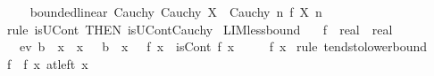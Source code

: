 \begin{isabellebody}
\isanewline
\ \ \isamarkupfalse%
\isanewline
{}\isamarkupfalse%
%
\endisatagproof
{\isafoldproof}%
%
\isadelimproof
\isanewline
%
\endisadelimproof
\isanewline
{}\isamarkupfalse%
\ {\isacharparenleft}{\kern0pt}\ bounded{\isacharunderscore}{\kern0pt}linear{\isacharparenright}{\kern0pt}\ Cauchy{\isacharcolon}{\kern0pt}\ {\isachardoublequoteopen}Cauchy\ X\ {\isasymLongrightarrow}\ Cauchy\ {\isacharparenleft}{\kern0pt}{\isasymlambda}n{\isachardot}{\kern0pt}\ f\ {\isacharparenleft}{\kern0pt}X\ n{\isacharparenright}{\kern0pt}{\isacharparenright}{\kern0pt}{\isachardoublequoteclose}\isanewline
%
\isadelimproof
\ \ %
\endisadelimproof
%
\isatagproof
{}\isamarkupfalse%
\ {\isacharparenleft}{\kern0pt}rule\ isUCont\ {\isacharbrackleft}{\kern0pt}THEN\ isUCont{\isacharunderscore}{\kern0pt}Cauchy{\isacharbrackright}{\kern0pt}{\isacharparenright}{\kern0pt}%
\endisatagproof
{\isafoldproof}%
%
\isadelimproof
\isanewline
%
\endisadelimproof
\isanewline
{}\isamarkupfalse%
\ LIM{\isacharunderscore}{\kern0pt}less{\isacharunderscore}{\kern0pt}bound{\isacharcolon}{\kern0pt}\isanewline
\ \ \ f\ {\isacharcolon}{\kern0pt}{\isacharcolon}{\kern0pt}\ {\isachardoublequoteopen}real\ {\isasymRightarrow}\ real{\isachardoublequoteclose}\isanewline
\ \ \ ev{\isacharcolon}{\kern0pt}\ {\isachardoublequoteopen}b\ {\isacharless}{\kern0pt}\ x{\isachardoublequoteclose}\ {\isachardoublequoteopen}{\isasymforall}\ x{\isacharprime}{\kern0pt}\ {\isasymin}\ {\isacharbraceleft}{\kern0pt}\ b\ {\isacharless}{\kern0pt}{\isachardot}{\kern0pt}{\isachardot}{\kern0pt}{\isacharless}{\kern0pt}\ x{\isacharbraceright}{\kern0pt}{\isachardot}{\kern0pt}\ {}\ {\isasymle}\ f\ x{\isacharprime}{\kern0pt}{\isachardoublequoteclose}\ \ {\isachardoublequoteopen}isCont\ f\ x{\isachardoublequoteclose}\isanewline
\ \ \ {\isachardoublequoteopen}{}\ {\isasymle}\ f\ x{\isachardoublequoteclose}\isanewline
%
\isadelimproof
%
\endisadelimproof
%
\isatagproof
{}\isamarkupfalse%
\ {\isacharparenleft}{\kern0pt}rule\ tendsto{\isacharunderscore}{\kern0pt}lowerbound{\isacharparenright}{\kern0pt}\isanewline
\ \ \isamarkupfalse%
\ {\isachardoublequoteopen}{\isacharparenleft}{\kern0pt}f\ {\isasymlonglongrightarrow}\ f\ x{\isacharparenright}{\kern0pt}\ {\isacharparenleft}{\kern0pt}at{\isacharunderscore}{\kern0pt}left\ x{\isacharparenright}{\kern0pt}{\isachardoublequoteclose}\isanewline
\ \ \ \ \isamarkupfalse%

\end{isabellebody}
